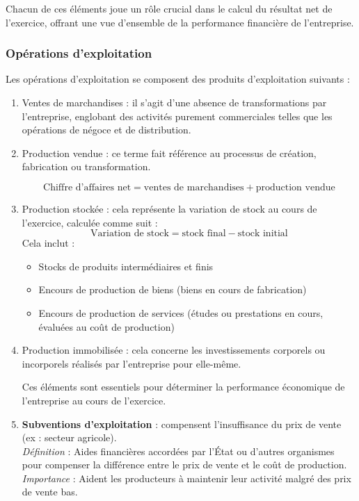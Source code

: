 \documentclass[a4paper, 12pt]{report}
\begin{document}
Chacun de ces éléments joue un rôle crucial dans le calcul du résultat net de l'exercice, offrant une vue d'ensemble de la performance financière de l'entreprise.

\subsubsection{Opérations d'exploitation}

Les opérations d'exploitation se composent des produits d'exploitation suivants :

\begin{enumerate}
	\item Ventes de marchandises : il s'agit d'une absence de transformations par l'entreprise, englobant des activités purement commerciales telles que les opérations de négoce et de distribution.
	\item Production vendue : ce terme fait référence au processus de création, fabrication ou transformation. 

\[
\text{Chiffre d'affaires net} = \text{ventes de marchandises} + \text{production vendue}
\]

\item Production stockée : cela représente la variation de stock au cours de l'exercice, calculée comme suit :
\[
\text{Variation de stock} = \text{stock final} - \text{stock initial}
\]
Cela inclut :
\begin{itemize}
	\item Stocks de produits intermédiaires et finis
	\item Encours de production de biens (biens en cours de fabrication)
	\item Encours de production de services (études ou prestations en cours, évaluées au coût de production)
\end{itemize}

\item Production immobilisée : cela concerne les investissements corporels ou incorporels réalisés par l'entreprise pour elle-même.

Ces éléments sont essentiels pour déterminer la performance économique de l'entreprise au cours de l'exercice.

   \item \textbf{Subventions d'exploitation} : compensent l'insuffisance du prix de vente (ex : secteur agricole).\\
\textit{Définition} : Aides financières accordées par l'État ou d'autres organismes pour compenser la différence entre le prix de vente et le coût de production.\\
\textit{Importance} : Aident les producteurs à maintenir leur activité malgré des prix de vente bas.


\end{enumerate}
\end{document}
